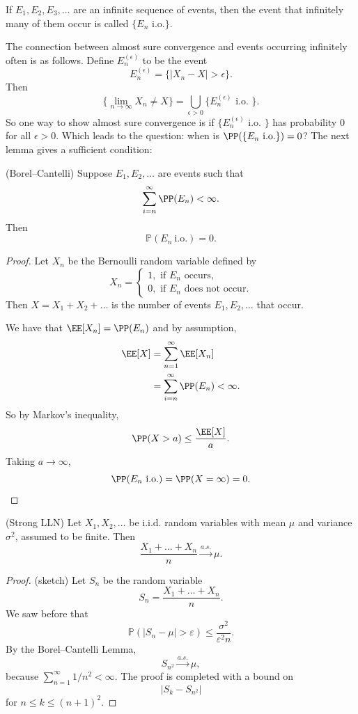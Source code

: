 \documentclass{ximera}
\begin{document}
\begin{definition}
If $E_1,E_2,E_3,\ldots$ are an infinite sequence of events, then the event that infinitely many of them occur is called $\{E_n \text{ i.o.}\}$.
\end{definition}

The connection between almost sure convergence and events occurring infinitely often is as follows. Define $E_n^{(\epsilon)}$ to be the event
$$
E_n^{(\epsilon)} = \{ \vert X_n - X\vert> \epsilon\}.
$$
Then 
$$
\{ \lim_{n\rightarrow \infty} X_n \neq X \} = \bigcup_{\epsilon >0} \{E_n^{(\epsilon)} \text{ i.o. } \}.
$$
So one way to show almost sure convergence is if $\{E_n^{(\epsilon)} \text{ i.o. } \}$ has probability $0$ for all $\epsilon>0$. Which leads to the question: when is $\PP(\{E_n \text{ i.o.}\})=0$? The next lemma gives a sufficient condition:

\begin{lemma} (Borel--Cantelli)
Suppose $E_1,E_2,\ldots$ are events such that
$$
\sum_{i=n}^{\infty} \PP(E_n) < \infty.
$$
Then 
$$
\mathbb{P}(E_n\   \text{i.o.}) = 0. 
$$
\end{lemma}
\begin{proof}
Let $X_n$ be the Bernoulli random variable defined by 
$$
X_n 
= 
\begin{cases}
1, \text{ if } E_n \text{ occurs},\\
0, \text{ if } E_n \text{ does not occur}.
\end{cases}
$$
Then $X= X_1 + X_2 + \ldots$ is the number of events $E_1,E_2,\ldots$ that occur. 

We have that $\EE[X_n]= \PP(E_n)$ and by assumption,
\begin{align*}
\EE[X] &= \sum_{n=1}^{\infty}\EE[X_n]\\
&=\sum_{i=n}^{\infty} \PP(E_n) < \infty.
\end{align*}
So by Markov's inequality,
$$
\PP(X > a ) \leq \frac{\EE[X]}{a}.
$$
Taking $a\rightarrow \infty$,
$$
\PP(E_n \text{ i.o.}) = \PP(X = \infty)=0.
$$
\end{proof}

\begin{theorem}
(Strong LLN)
Let $X_1,X_2,\ldots$ be i.i.d. random variables with mean $\mu$ and variance $\sigma^2$, assumed to be finite. Then
$$
\frac{X_1 + \ldots + X_n}{n} \stackrel{a.s.}{\rightarrow} \mu.
$$
\end{theorem}
\begin{proof} (sketch)
Let $S_n$ be the random variable
$$
S_n = \frac{X_1 + \ldots + X_n}{n}.
$$ 
We saw before that 
$$
\mathbb{P}\left(\left|S_{n}-\mu\right|>\varepsilon\right) \leqslant \frac{\sigma^{2}}{\varepsilon^{2} n}.
$$
By the Borel--Cantelli Lemma,
$$
S_{n^2} \stackrel{a.s.}{\rightarrow} \mu,
$$
because $\sum_{n=1}^{\infty} 1/n^2 <\infty$. The proof is completed with a bound on 
$$
\vert S_k - S_{n^2}\vert
$$
for $ n \leq k \leq (n+1)^2$.
\end{proof}
\end{document}
